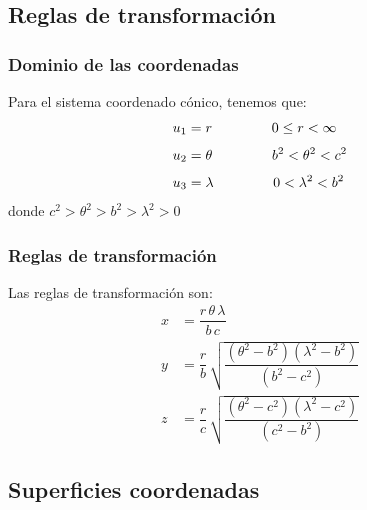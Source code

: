 \documentclass[12pt]{beamer}
\begin{document}
\subsection{Reglas de transformación}
\begin{frame}
\frametitle{Dominio de las coordenadas}
Para el sistema coordenado cónico, tenemos que:
\pause
\begin{align*}
u_{1} &= r \hspace{1.5cm} 0 \leq r < \infty \\[0.35em]
u_{2} &= \theta \hspace{1.5cm} b^{2} < \theta^{2} < c^{2} \\[0.35em]
u_{3} &= \lambda \hspace{1.5cm} 0 < \lambda^{2} < b^{2}
\end{align*}
donde $c^{2} > \theta^{2} > b^{2} > \lambda^{2} > 0$
\end{frame}
\begin{frame}
\frametitle{Reglas de transformación}
Las reglas de transformación son:
\pause
\begin{align*}
x &= \dfrac{r \, \theta \, \lambda}{b \, c} \\[0.5em]
y &= \dfrac{r}{b} \, \sqrt{\dfrac{(\theta^{2} - b^{2})(\lambda^{2} - b^{2})}{(b^{2} - c^{2})}} \\[0.5em]
z &= \dfrac{r}{c} \, \sqrt{\dfrac{(\theta^{2} - c^{2})(\lambda^{2} - c^{2})}{(c^{2} - b^{2})}}
\end{align*}
\end{frame}

\subsection{Superficies coordenadas}
\end{document}
